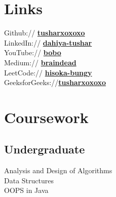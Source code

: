 \documentclass[]{deedy-resume-openfont}
\begin{document}
\begin{minipage}[t]{0.33\textwidth}
\section{Links} 
Github:// \href{https://github.com/tusharxoxoxo}{\bf tusharxoxoxo} \\
LinkedIn://  \href{https://www.linkedin.com/in/dahiya-tushar/}{\bf dahiya-tushar} \\
YouTube://  \href{https://www.youtube.com/@bobo5}{\bf bobo} \\
Medium://  \href{https://brain-dead.medium.com/}{\bf braindead}\\
LeetCode:// \href{https://leetcode.com/hisoka_bungy/}{\bf hisoka-bungy}\\
GeeksforGeeks://\href{https://auth.geeksforgeeks.org/user/tusharxoxoxo/practice/}{\bf tusharxoxoxo}


\section{Coursework}


\subsection{Undergraduate}
Analysis and Design of Algorithms \\
Data Structures \\
OOPS in Java\\


\end{minipage}
\end{document}
